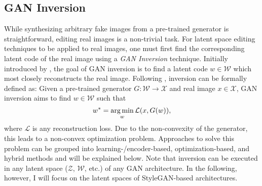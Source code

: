 \subsection{GAN Inversion}\label{sec:gan_inversion}
While synthesizing arbitrary fake images from a pre-trained generator is straightforward, editing real images is a non-trivial task. For latent space editing techniques to be applied to real images, one must first find the corresponding latent code of the real image using a \textit{GAN Inversion} technique. Initially introduced by \cite{zhu2016generative}, the goal of GAN inversion is to find a latent code $w \in \mathcal{W}$ which most closely reconstructs the real image. Following \cite{bermano2022state}, inversion can be formally defined as: Given a pre-trained generator $G: \mathcal{W} \rightarrow \mathcal{X}$ and real image $x \in \mathcal{X}$,  GAN inversion aims to find $w \in \mathcal{W}$ such that 
\begin{equation}
\label{eq:gan_inversion}
    w^* =  \operatorname*{arg\,min}_{w} \mathcal{L}(x, G(w)),
\end{equation}
where $\mathcal{L}$ is any reconstruction loss. Due to the non-convexity of the generator, this leads to a non-convex optimization problem. Approaches to solve this problem can be grouped into learning-/encoder-based, optimization-based, and hybrid methods \citep[p.6]{xia2022gan} and will be explained below. Note that inversion can be executed in any latent space ($\mathcal{Z}$, $\mathcal{W}$, etc.) of any GAN architecture. In the following, however, I will focus on the latent spaces of StyleGAN-based architectures. 

